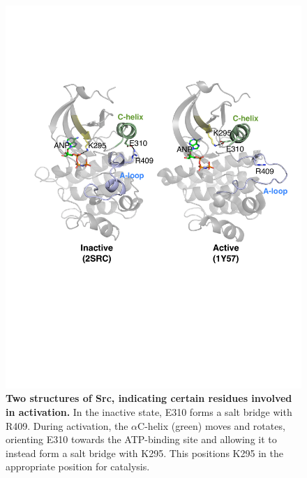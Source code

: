 \documentclass[aps,pre,twocolumn,nofootinbib,superscriptaddress,linenumbers]{revtex4-1}
\begin{document}

\begin{figure}[tb]
    \includegraphics[width=1.0\textwidth]{residue_pair_distances/src/src_ref_structures}
    
    \caption{{\bf Two structures of Src, indicating certain residues involved in activation.}
    In the inactive state, E310 forms a salt bridge with R409.
    During activation, the $\alpha$C-helix (green) moves and rotates, orienting E310 towards the ATP-binding site and allowing it to instead form a salt bridge with K295.
    This positions K295 in the appropriate position for catalysis.
  }
  \label{figure:src-ref-structures}
\end{figure}
\end{document}

